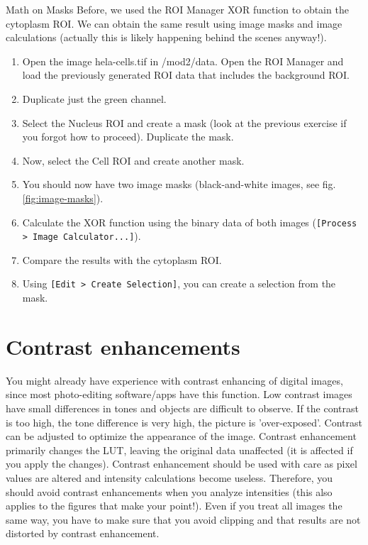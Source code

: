 \begin{taskbox}{Math on Masks}
Before, we used the ROI Manager XOR function to obtain the cytoplasm ROI. We can obtain the same result using image masks and image calculations (actually this is likely happening behind the scenes anyway!).

\begin{enumerate}
	\item Open the image hela-cells.tif in /mod2/data. Open the ROI Manager and load the previously generated ROI data that includes the background ROI.
	\item Duplicate just the green channel.
	\item Select the Nucleus ROI and create a mask (look at the previous exercise if you forgot how to proceed). Duplicate the mask.
	\item Now, select the Cell ROI and create another mask.
	\item You should now have two image masks (black-and-white images, see fig. \ref{fig:image-masks}).	
	
		\begin{minipage}[t]{\linewidth}
		\begin{center}
		\medskip
		\label{fig:image-masks}
		\end{center}
	\end{minipage}
	
	\item Calculate the XOR function using the binary data of both images (\texttt{[Process > Image Calculator...]}).
	\item Compare the results with the cytoplasm ROI.
	\item Using \texttt{[Edit > Create Selection]}, you can create a selection from the mask.
\end{enumerate}

\end{taskbox}

\section{Contrast enhancements}
You might already have experience with contrast enhancing of digital images, since most photo-editing software/apps have this function. Low contrast images have small differences in tones and objects are difficult to observe. If the contrast is too high, the tone difference is very high, the picture is 'over-exposed'. Contrast can be adjusted to optimize the appearance of the image. Contrast enhancement primarily changes the LUT, leaving the original data unaffected (it is affected if you apply the changes). Contrast enhancement should be used with care as pixel values are altered and intensity calculations become useless. Therefore, you should avoid contrast enhancements when you analyze intensities (this also applies to the figures that make your point!). Even if you treat all images the same way, you have to make sure that you avoid clipping and that results are not distorted by contrast enhancement.

